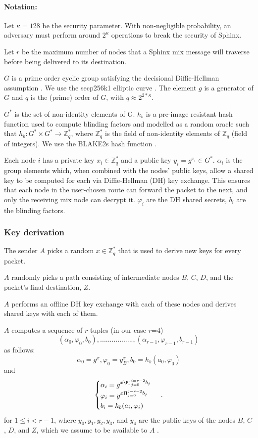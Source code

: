 \paragraph{Notation:}Let $\kappa=128$ be the security parameter. With non-negligible probability, an adversary must perform around $2^\kappa$ operations to break the security of Sphinx.

Let $r$ be the maximum number of nodes that a Sphinx mix message will traverse before being delivered to its destination.

$G$ is a prime order cyclic group satisfying the decisional Diffie-Hellman assumption \cite{Boneh_1998}. We use the secp256k1 elliptic curve \cite{sec2}. The element $g$ is a generator of $G$ and $q$ is the (prime) order of $G$, with $q\approx2^{2*\kappa}$.

$G^*$ is the set of non-identity elements of G. $h_b$ is a pre-image resistant hash function used to compute blinding factors and modelled as a random oracle such that
$h_b:G^*\times G^*\rightarrow\mathbb{Z}^*_q$, where $\mathbb{Z}^*_q$ is the field of non-identity elements of $\mathbb{Z}_q$ (field of integers). We use the BLAKE2s hash function \cite{blake2}.

Each node $i$ has a private key $x_{i}\in \mathbb{Z}^*_q$ and a public key $y_{i}=g^{x_{i}}\in G^*$.
$\alpha_i$ is the group elements which, when combined with the nodes’ public keys, allow a shared key to be computed for each via Diffie-Hellman (DH) key exchange. This ensures that each node in the user-chosen route can forward the packet to the next, and only the receiving mix node can decrypt it.
$\varphi_i$ are the DH shared secrets, $b_i$ are the blinding factors.

\subsubsection{Key derivation}
The sender $A$ picks a random $x\in \mathbb{Z}^*_q$ that is used to derive new keys for every packet.

$A$ randomly picks a path consisting of intermediate nodes $B$, $C$, $D$, and the packet's final destination, $Z$.

$A$ performs an offline DH key exchange with each of these nodes and derives shared keys with each of them.

$A$ computes a sequence of $r$ tuples (in our case $r$=4)  $$(\alpha_0,\varphi_0,b_0),.................,(\alpha_{r-1},\varphi_{r-1},b_{r-1})$$ as follows:
$$\alpha_0=g^x,\varphi_0=y^x_B,b_0=h_b(a_0,\varphi_0)$$
and
\begin{equation}
    \begin{cases}
        \alpha_i=g^{x\Pj_{j=0}^{i=r-2}b_j}\\
        \varphi_i=y^{x\Pi_{j=0}^{j=r-2}b_j} \\
        b_i=h_b(a_i,\varphi_i)
    \end{cases}\,.
    \label{eq:1}
\end{equation}
for $1\le i < r-1$, where $y_0,y_1, y_2, y_3$, and $y_4$ are the public keys of the nodes $B$, $C$, $D$, and $Z$, which we assume to be available to $A$ .

